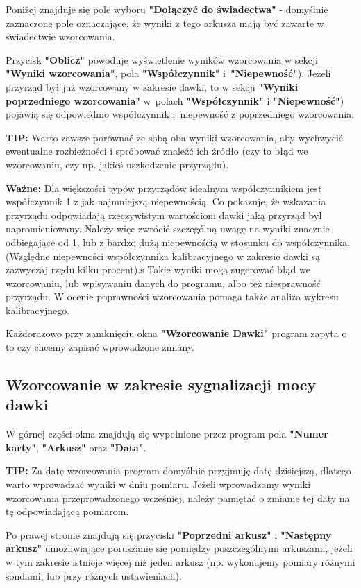 Poniżej znajduje się pole wyboru \textbf{"Dołączyć do świadectwa"} - domyślnie zaznaczone pole oznaczające, że wyniki z tego arkusza mają być zawarte w świadectwie wzorcowania.

Przycisk \textbf{"Oblicz"} powoduje wyświetlenie wyników wzorcowania w sekcji \textbf{"Wyniki wzorcowania"}, pola \textbf{"Współczynnik"} i~\textbf{"Niepewność"}). Jeżeli przyrząd był już wzorcowany w zakresie dawki, to w sekcji \textbf{"Wyniki poprzedniego wzorcowania"} w~polach \textbf{"Współczynnik"} i \textbf{"Niepewność"}) pojawią się odpowiednio współczynnik i~niepewność z poprzedniego wzorcowania. 

\textbf{TIP:} Warto zawsze porównać ze sobą oba wyniki wzorcowania, aby wychwycić ewentualne rozbieżności i spróbować znaleźć ich źródło (czy to błąd we wzorcowaniu, czy np. jakieś uszkodzenie przyrządu).

\textbf{Ważne:} Dla większości typów przyrządów idealnym współczynnikiem jest współczynnik 1 z jak najmniejszą niepewnością. Co pokazuje, że wskazania przyrządu odpowiadają rzeczywistym wartościom dawki jaką przyrząd był napromieniowany. Należy więc zwrócić szczególną uwagę na wyniki znacznie odbiegające od 1, lub z bardzo dużą niepewnością w stosunku do współczynnika. (Względne niepewności współczynnika kalibracyjnego w zakresie dawki są zazwyczaj rzędu kilku procent).s Takie wyniki mogą sugerować błąd we wzorcowaniu, lub wpisywaniu danych do programu, albo też niesprawność przyrządu. W ocenie poprawności wzorcowania pomaga także analiza wykresu kalibracyjnego.

Każdorazowo przy zamknięciu okna \textbf{"Wzorcowanie Dawki"} program zapyta o to czy chcemy zapisać wprowadzone zmiany.

\subsection{Wzorcowanie w zakresie sygnalizacji mocy dawki}
\label{wzorcowanie_syg_moc}

	W górnej części okna znajdują się wypełnione przez program pola \textbf{"Numer karty"}, \textbf{"Arkusz"} oraz \textbf{"Data"}. 
	
	\textbf{TIP:} Za datę wzorcowania program domyślnie przyjmuję datę dzisiejszą, dlatego warto wprowadzać wyniki w dniu pomiaru. Jeżeli wprowadzamy wyniki wzorcowania przeprowadzonego wcześniej, należy pamiętać o zmianie tej daty na tę odpowiadającą pomiarom.
	
	Po prawej stronie znajdują się przyciski \textbf{"Poprzedni arkusz"} i \textbf{"Następny arkusz"} umożliwiające poruszanie się pomiędzy poszczególnymi arkuszami, jeżeli w tym zakresie istnieje więcej niż jeden arkusz (np. wykonujemy pomiary różnymi sondami, lub przy różnych ustawieniach).
	
